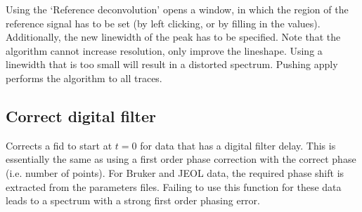 \documentclass[11pt,a4paper]{article}
\begin{document}

Using the `Reference deconvolution' opens a window, in which the region of the reference signal has to be set (by left clicking, or by filling in the values). Additionally, the new linewidth of the peak has to be specified. Note that the algorithm cannot increase resolution, only improve the lineshape. Using a linewidth that is too small will result in a distorted spectrum. Pushing apply performs the algorithm to all traces.

\subsection{Correct digital filter}
Corrects a fid to start at $t=0$ for data that has a digital filter delay. This is essentially the
same as using a first order phase correction with the correct phase (i.e. number of points). For
Bruker and JEOL data, the required phase shift is extracted from the parameters files. Failing to
use this function for these data leads to a spectrum with a strong first order phasing error.

\end{document}
